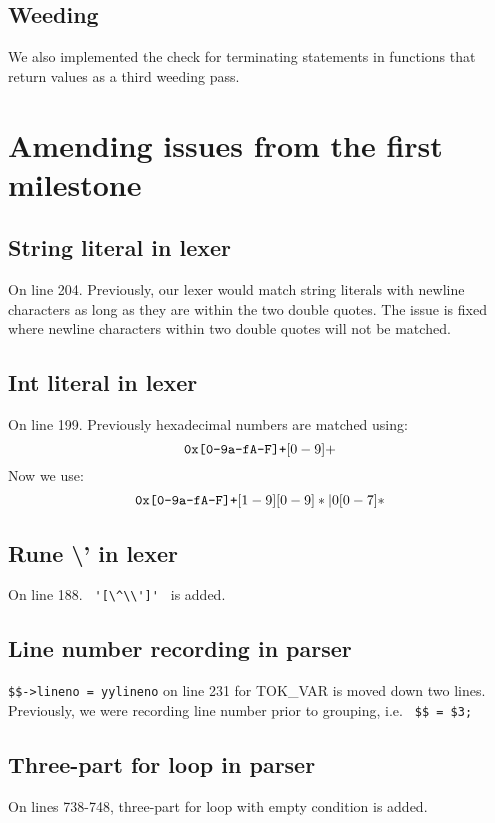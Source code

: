 \documentclass{article}
\begin{document}
\subsection{Weeding}

We also implemented the check for terminating statements in functions that
return values as a third weeding pass.

\section{Amending issues from the first milestone}


\subsection{String literal in lexer}
On line 204. Previously, our lexer would match string literals with newline characters as long as they are within the two double quotes. The issue is fixed where newline characters within two double quotes will not be matched.

\subsection{Int literal in lexer}
On line 199. Previously hexadecimal numbers are matched using:
\[
        \verb|0x[0-9a-fA-F]+|[0-9]+
\]
Now we use:
\[
        \verb|0x[0-9a-fA-F]+|[1-9][0-9]*|0[0-7]*
\]

\subsection{Rune \textbackslash{}' in lexer}
On line 188. \verb| '[\^\\']' | is added.

\subsection{Line number recording in parser}
\verb|$$->lineno = yylineno| on line 231 for TOK\_VAR is moved down two lines. Previously, we were recording line number prior to grouping, i.e. \verb| $$ = $3; |

\subsection{Three-part for loop in parser}
On lines 738-748, three-part for loop with empty condition is added.
\end{document}
